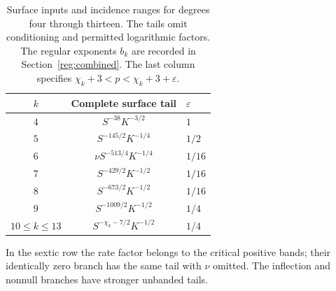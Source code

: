 \documentclass[11pt]{amsart}
\theoremstyle{definition}
\theoremstyle{remark}
\numberwithin{equation}{section}
\begin{document}
{\setlength{\LTcapwidth}{\textwidth}
\begin{longtable}{ccl}
\caption{Surface inputs and incidence ranges for degrees four through thirteen. The tails omit conditioning and permitted logarithmic factors. The regular exponents $b_k$ are recorded in Section~\ref{reg:combined}. The last column specifies $\chi_k+3<p<\chi_k+3+\varepsilon$.}\label{an:incidence-inputs}\\
\toprule
$k$ & Complete surface tail & $\varepsilon$\\
\midrule
$4$ & $S^{-38}K^{-3/2}$ & $1$\\
$5$ & $S^{-145/2}K^{-1/4}$ & $1/2$\\
$6$ & $\nu S^{-513/4}K^{-1/4}$ & $1/16$\\
$7$ & $S^{-429/2}K^{-1/2}$ & $1/16$\\
$8$ & $S^{-673/2}K^{-1/2}$ & $1/16$\\
$9$ & $S^{-1009/2}K^{-1/2}$ & $1/4$\\
$10\le k\le13$ & $S^{-\chi_k-7/2}K^{-1/2}$ & $1/4$\\
\bottomrule
\end{longtable}}

In the sextic row the rate factor belongs to the critical positive bands; their identically zero branch has the same tail with $\nu$ omitted. The inflection and nonnull branches have stronger unbanded tails.
\end{document}
